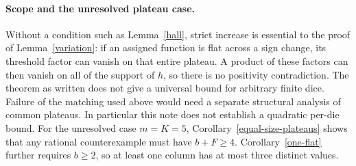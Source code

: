 \documentclass[11pt]{article}
\begin{document}
\paragraph{Scope and the unresolved plateau case.}
Without a condition such as Lemma~\ref{hall}, strict increase is essential
to the proof of Lemma~\ref{variation}:
if an assigned function is flat across a sign change, its threshold
factor can vanish on that entire plateau. A product of these factors
can then vanish on all of the support of $h$, so there is no positivity
contradiction. The theorem as written does not give a universal bound
for arbitrary finite dice. Failure of the matching used above would
need a separate structural analysis of common plateaus.
In particular this note does not establish a quadratic per-die bound.
For the unresolved case $m=K=5$, Corollary~\ref{equal-size-plateaus}
shows that any rational counterexample must have $b+F\ge4$.
Corollary~\ref{one-flat} further requires $b\ge2$, so at least one
column has at most three distinct values.
\end{document}
